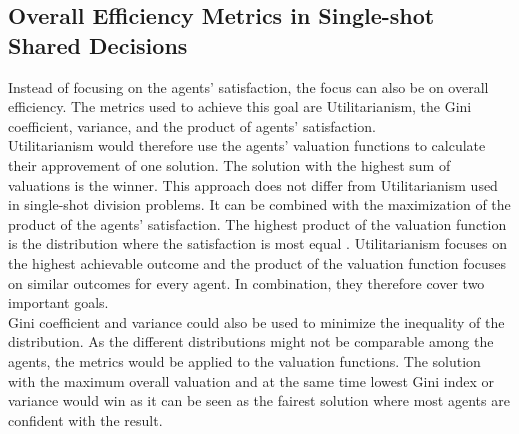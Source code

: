 \documentclass[german, a4paper, 11pt, oneside]{scrbook}
\begin{document}
\subsection{Overall Efficiency Metrics in Single-shot Shared Decisions}
Instead of focusing on the agents' satisfaction, the focus can also be on overall efficiency. The metrics used to achieve this goal are Utilitarianism, the Gini coefficient, variance, and the product of agents' satisfaction. \\Utilitarianism would therefore use the agents' valuation functions to calculate their approvement of one solution. The solution with the highest sum of valuations is the winner. This approach does not differ from Utilitarianism used in single-shot division problems. It can be combined with the maximization of the product of the agents' satisfaction. The highest product of the valuation function is the distribution where the satisfaction is most equal \cite{Albrecht.2024}. Utilitarianism focuses on the highest achievable outcome and the product of the valuation function focuses on similar outcomes for every agent. In combination, they therefore cover two important goals.
\\Gini coefficient and variance could also be used to minimize the inequality of the distribution. As the different distributions might not be comparable among the agents, the metrics would be applied to the valuation functions. The solution with the maximum overall valuation and at the same time lowest Gini index or variance would win as it can be seen as the fairest solution where most agents are confident with the result.
\end{document}
